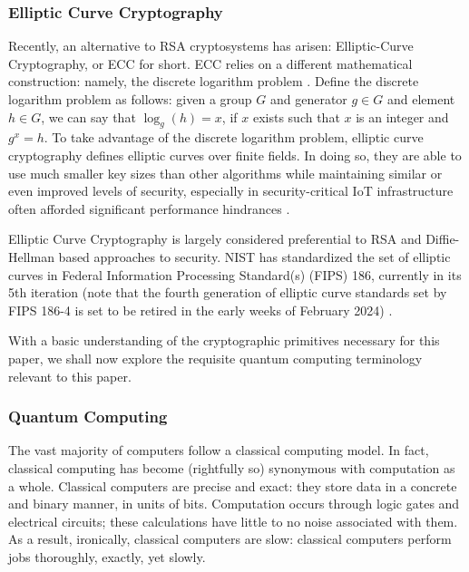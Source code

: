 \documentclass[a4paper]{article}
\begin{document}
\subsubsection[ecc]{Elliptic Curve Cryptography}
Recently, an alternative to RSA cryptosystems has arisen:
Elliptic-Curve Cryptography, or ECC for short. ECC relies on a different
mathematical construction: namely, the discrete logarithm problem
\autocite{schneierAppliedCryptographyProtocols1996}. Define the discrete
logarithm problem as follows: given a group \(G\) and generator
\(g \in G\) and element \(h \in G\), we can say that \(\log_g(h) = x\),
if \(x\) exists such that \(x\) is an integer and \(g^x = h\). To take
advantage of the discrete logarithm problem, elliptic curve cryptography
defines elliptic curves over finite fields. In doing so, they are able
to use much smaller key sizes than other algorithms while maintaining
similar or even improved levels of security, especially in
security-critical IoT infrastructure often afforded significant
performance hindrances \autocite{dhillonEllipticCurveCryptography2016,liuIoTNUMSEvaluatingNUMS2019}
.

Elliptic Curve Cryptography is largely considered preferential to RSA
and Diffie-Hellman based approaches to security. NIST has standardized
the set of elliptic curves in Federal Information Processing Standard(s)
(FIPS) 186, currently in its 5th iteration (note that the fourth
generation of elliptic curve standards set by FIPS 186-4 is set to be
retired in the early weeks of February 2024)
\autocite{DigitalSignatureStandard2023}.

With a basic understanding of the cryptographic primitives necessary for
this paper, we shall now explore the requisite quantum computing
terminology relevant to this paper.

\subsubsection[quantum]{Quantum Computing}
The vast majority of computers follow a classical computing model. In fact,
classical computing has become (rightfully so) synonymous with
computation as a whole. Classical computers are precise and exact: they
store data in a concrete and binary manner, in units of bits.
Computation occurs through logic gates and electrical circuits; these
calculations have little to no noise associated with them. As a result,
ironically, classical computers are slow: classical computers perform
jobs thoroughly, exactly, yet slowly.
\end{document}
